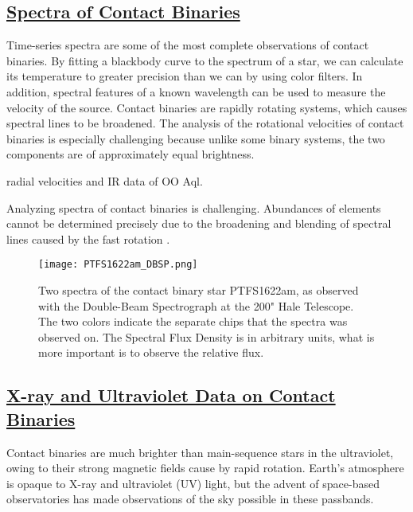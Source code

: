 \documentclass[12pt]{article} %
\numberwithin{equation}{section} %
\begin{document}
\subsection[Spectra of Contact Binaries]{\hyperlink{toc}{Spectra of Contact Binaries}} \label{sec: Spectra of Contact Binaries}

Time-series spectra are some of the most complete observations of contact binaries. By fitting a blackbody curve to the spectrum of a star, we can calculate its temperature to greater precision than we can by using color filters. In addition, spectral features of a known wavelength can be used to measure the velocity of the source. Contact binaries are rapidly rotating systems, which causes spectral lines to be broadened. The analysis of the rotational velocities of contact binaries is especially challenging because unlike some binary systems, the two components are of approximately equal brightness.

\citep{hrivnak1989radial} radial velocities and IR data of OO Aql.

Analyzing spectra of contact binaries is challenging. Abundances of elements cannot be determined precisely due to the broadening and blending of spectral lines caused by the fast rotation \citep{gazeas2006masses}. 

\begin{figure}[H]
\centering
\texttt{[image: PTFS1622am\_DBSP.png]}
\caption{Two spectra of the contact binary star PTFS1622am, as observed with the Double-Beam Spectrograph at the 200" Hale Telescope. The two colors indicate the separate chips that the spectra was observed on. The Spectral Flux Density is in arbitrary units, what is more important is to observe the relative flux.}
\label{fig: PTFS1622am_DBSP}
\end{figure}


\subsection[X-ray and Ultraviolet Data on Contact Binaries]{\hyperlink{toc}{X-ray and Ultraviolet Data on Contact Binaries}} \label{sec: X-ray and Ultraviolet Data on Contact Binaries}

Contact binaries are much brighter than main-sequence stars in the ultraviolet, owing to their strong magnetic fields cause by rapid rotation. Earth's atmosphere is opaque to X-ray and ultraviolet (UV) light, but the advent of space-based observatories has made observations of the sky possible in these passbands.
\end{document}
